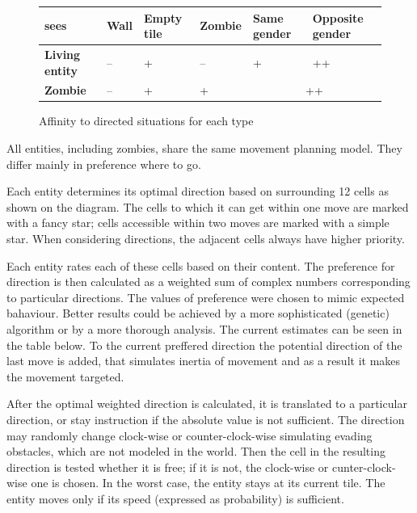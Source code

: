 \documentclass[a4paper]{article}
\begin{document}
\begin{figure}[ht]
    \centering
    \begin{tabu} {| X[1.8,c,p] || X[1,c,p] | X[1,c,p] | X[1,c,p] | X[1,c,p] | X[1.2,c,p] |}
        \rowfont{\bfseries}
        \hline
        sees &
        Wall &
        Empty tile&
        Zombie &
        Same gender &
        Opposite gender \\
        \hline
        \hline
        \textbf{Living entity} & -- & + & -- & + & ++ \\
        \hline
        \textbf{Zombie} & -- & + & + &  \\
        \hline
    \end{tabu}
    \caption{Affinity to directed situations for each type}
\end{figure}

All entities, including zombies, share the same movement planning model.
They differ mainly in preference where to go.

Each entity determines its optimal direction based on surrounding 12 cells as shown on the diagram.
The cells to which it can get within one move are marked with a fancy star; cells accessible within two moves are marked with a simple star.
When considering directions, the adjacent cells always have higher priority.

Each entity rates each of these cells based on their content.
The preference for direction is then calculated as a weighted sum of complex numbers corresponding to particular directions.
The values of preference were chosen to mimic expected bahaviour.
Better results could be achieved by a more sophisticated (genetic) algorithm or by a more thorough analysis.
The current estimates can be seen in the table below.
To the current preffered direction the potential direction of the last move is added, that simulates inertia of movement and as a result it makes the movement targeted.

After the optimal weighted direction is calculated, it is translated to a particular direction, or stay instruction if the absolute value is not sufficient.
The direction may randomly change clock-wise or counter-clock-wise simulating evading obstacles, which are not modeled in the world.
Then the cell in the resulting direction is tested whether it is free; if it is not, the clock-wise or cunter-clock-wise one is chosen.
In the worst case, the entity stays at its current tile.
The entity moves only if its speed (expressed as probability) is sufficient.
\end{document}
